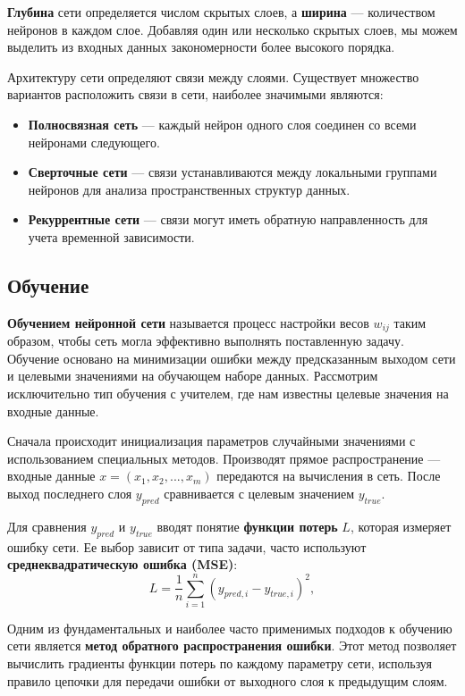 \documentclass[12pt, a4paper]{article}
\begin{document}
 \textbf{Глубина} сети определяется числом скрытых слоев, а \textbf{ширина} — количеством нейронов в каждом слое.  Добавляя один или несколько скрытых слоев, мы можем выделить  из входных данных закономерности более высокого порядка. 
 
 Архитектуру сети определяют связи между слоями. Существует множество вариантов расположить связи в сети, наиболее значимыми являются:
 \begin{itemize}
 	\item \textbf{Полносвязная сеть} --- каждый нейрон одного слоя соединен со всеми нейронами следующего.
 	\item \textbf{Сверточные сети} --- связи устанавливаются между локальными группами нейронов для анализа пространственных структур данных.
 	\item \textbf{Рекуррентные сети} --- связи могут иметь обратную направленность для учета временной зависимости. 
 \end{itemize}
  
\subsection{Обучение}
\textbf{Обучением нейронной сети} называется процесс настройки весов $w_{ij}$ таким образом, чтобы сеть могла эффективно выполнять поставленную задачу. Обучение основано на минимизации ошибки между предсказанным выходом сети и целевыми значениями на обучающем наборе данных. Рассмотрим исключительно тип обучения с учителем, где нам известны целевые значения на входные данные. \cite{2}

Сначала происходит инициализация параметров случайными значениями с использованием специальных методов. Производят прямое распространение --- входные данные $x = (x_1, x_2, ..., x_m)$ передаются на вычисления в сеть. После выход последнего слоя $y_{pred}$ сравнивается с целевым значением $y_{true}$.

Для сравнения $y_{pred}$ и $y_{true}$ вводят понятие \textbf{функции потерь} $L$, которая измеряет ошибку сети. Ее выбор зависит от типа задачи, часто используют \textbf{среднеквадратическую ошибка (MSE)}:
\begin{equation}
	L = \frac{1}{n} \sum_{i=1}^{n} (y_{pred, i} - y_{true, i})^2,
\end{equation}


Одним из фундаментальных и наиболее часто применимых подходов к обучению сети является \textbf{метод обратного распространения ошибки}. Этот метод позволяет вычислить градиенты функции потерь по каждому параметру сети, используя правило цепочки для передачи ошибки от выходного слоя к предыдущим слоям.
\end{document}
